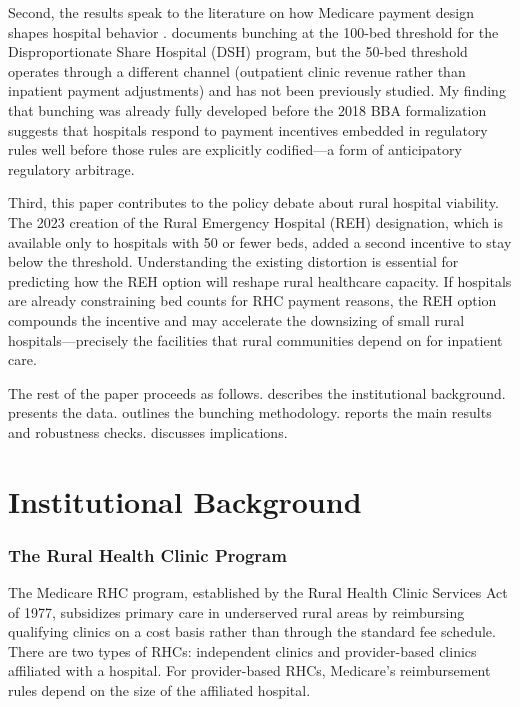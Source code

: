 \documentclass[12pt]{article}
\begin{document}
Second, the results speak to the literature on how Medicare payment design shapes hospital behavior \citep{duggan2000hospital, finkelstein2007effect}. \citet{bazzoli2018hospital} documents bunching at the 100-bed threshold for the Disproportionate Share Hospital (DSH) program, but the 50-bed threshold operates through a different channel (outpatient clinic revenue rather than inpatient payment adjustments) and has not been previously studied. My finding that bunching was already fully developed before the 2018 BBA formalization suggests that hospitals respond to payment incentives embedded in regulatory rules well before those rules are explicitly codified---a form of anticipatory regulatory arbitrage.

Third, this paper contributes to the policy debate about rural hospital viability. The 2023 creation of the Rural Emergency Hospital (REH) designation, which is available only to hospitals with 50 or fewer beds, added a second incentive to stay below the threshold. Understanding the existing distortion is essential for predicting how the REH option will reshape rural healthcare capacity. If hospitals are already constraining bed counts for RHC payment reasons, the REH option compounds the incentive and may accelerate the downsizing of small rural hospitals---precisely the facilities that rural communities depend on for inpatient care.

The rest of the paper proceeds as follows.  describes the institutional background.  presents the data.  outlines the bunching methodology.  reports the main results and robustness checks.  discusses implications.

\section{Institutional Background}\label{sec:background}

\subsubsection*{The Rural Health Clinic Program} The Medicare RHC program, established by the Rural Health Clinic Services Act of 1977, subsidizes primary care in underserved rural areas by reimbursing qualifying clinics on a cost basis rather than through the standard fee schedule. There are two types of RHCs: independent clinics and provider-based clinics affiliated with a hospital. For provider-based RHCs, Medicare's reimbursement rules depend on the size of the affiliated hospital.
\end{document}
